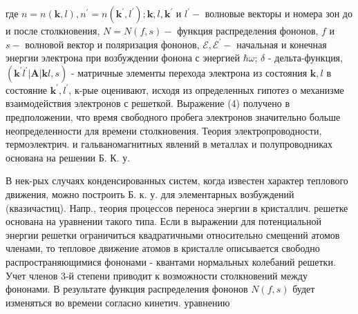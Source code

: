 \documentclass[10pt]{article}
\begin{document}
где $n=n(\boldsymbol{k}, l), n^{\prime}=n\left(\boldsymbol{k}^{\prime}, l^{\prime}\right) ; \boldsymbol{k}, l, \boldsymbol{k}^{\prime}$ и $l^{\prime}-$ волновые векторы и номера зон до и после столкновения, $N=N(f, s)-$ функция распределения фононов, $f$ и $s-$ волновой вектор и поляризация фононов, $\mathscr{E}, \mathscr{E}^{\prime}-$ начальная и конечная энергии электрона при возбуждении фонона с энергией $\hbar \omega$; $\delta$ - дельта-функция, $\left(\boldsymbol{k}^{\prime} l^{\prime}|\boldsymbol{A}| \boldsymbol{k} l, s\right)$ - матричные элементы перехода электрона из состояния $\boldsymbol{k}, l$ в состояние $\boldsymbol{k}^{\prime}, l^{\prime}$, к-рые оценивают, исходя из определенных гипотез о механизме взаимодействия электронов с решеткой. Выражение (4) получено в предположении, что время свободного пробега электронов значительно больше неопределенности для времени столкновения. Теория электропроводности, термоэлектрич. и гальваномагнитных явлений в металлах и полупроводниках основана на решении Б. К. у.



В нек-рых случаях конденсированных систем, когда известен характер теплового движения, можно построить Б. к. у. для элементарных возбуждений (квазичастиц). Напр., теория процессов переноса энергии в кристаллич. решетке основана на уравнении такого типа. Если в выражении для потенциальной энергии решетки ограничиться квадратичными относительно смещений атомов членами, то тепловое движение атомов в кристалле описывается свободно распространяющимися фононами - квантами нормальных колебаний решетки. Учет членов 3-й степени приводит к возможности столкновений между фононами. В результате функция распределения фононов $N(f, s)$ будет изменяться во времени согласно кинетич. уравнению
\end{document}
